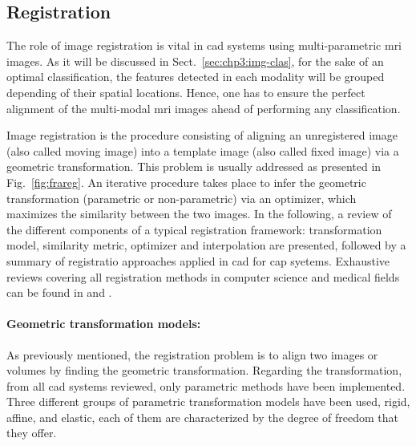 \subsection{Registration}\label{subsec:chp3:img-reg:reg}


The role of image registration is vital in \ac{cad} systems using multi-parametric \ac{mri} images. 
As it will be discussed in Sect.~\ref{sec:chp3:img-clas}, for the sake of an optimal classification, the features detected in each modality will be grouped depending of their spatial locations. 
Hence, one has to ensure the perfect alignment of the multi-modal \ac{mri} images ahead of performing any classification.

Image registration is the procedure consisting of aligning an unregistered image (also called moving image) into a template image (also called fixed image) via a geometric transformation.
This problem is usually addressed as presented in Fig.~\ref{fig:frareg}.
An iterative procedure takes place to infer the geometric transformation (parametric or non-parametric) via an optimizer, which maximizes the similarity between the two images.
In the following, a review of the different components of a typical registration framework: transformation model, similarity metric, optimizer and interpolation are presented, followed by a summary of registratio approaches applied in \ac{cad} for \ac{cap} syetems.
Exhaustive reviews covering all registration methods in computer science and medical fields can be found in \cite{Maintz1998} and \cite{Zitova2003}.



\paragraph{Geometric transformation models:}
As previously mentioned, the registration problem is to align two images or volumes by finding the geometric transformation.
Regarding the transformation, from all \ac{cad} systems reviewed, only parametric methods have been implemented.
Three different groups of parametric transformation models have been used, rigid, affine, and elastic, each of them are characterized by the degree of freedom that they offer.

